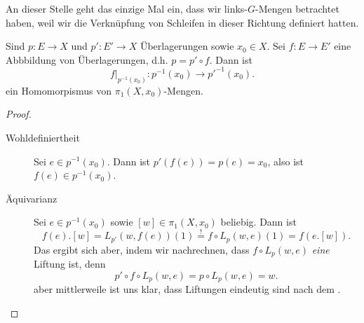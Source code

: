 \begin{oral}
    An dieser Stelle geht das einzige Mal ein, dass wir links-$G$-Mengen betrachtet haben, weil wir die Verknüpfung von Schleifen in dieser Richtung definiert hatten.
\end{oral}

\begin{lemma}
    Sind $p\colon  E\to X$ und $p'\colon E'\to X$ Überlagerungen sowie $x_0\in X$. Sei $f\colon  E\to  E'$ eine Abbbildung von Überlagerungen, d.h. $p = p' \circ f$. Dann ist
    \[
        f|_{p^{-1} (x_0)}\colon  p^{-1} (x_0) \to  p'^{-1}(x_0)
    .\] 
    ein Homomorpismus von $\pi_1(X,x_0)$-Mengen.
\end{lemma}
\begin{proof}
    \begin{description}
        \item[Wohldefiniertheit] Sei $e\in p^{-1} (x_0)$. Dann ist $p'(f(e)) = p(e) = x_0$, also ist $f(e) \in p^{-1} (x_0)$.
        \item[Äquivarianz] Sei $e\in p^{-1} (x_0)$ sowie $[w]\in \pi_1(X,x_0)$ beliebig. Dann ist
            \[
                f(e).[w] = L_{p'}(w,f(e))(1) \stackrel{!}{=} f \circ L_p(w,e)(1) = f(e.[w])
            .\] 
            Das ergibt sich aber, indem wir nachrechnen, dass $f \circ  L_p(w,e)$ \textit{eine} Liftung ist, denn
            \[
                p' \circ  f \circ  L_p(w,e) = p \circ  L_p(w,e) = w
            .\]
            aber mittlerweile ist uns klar, dass Liftungen eindeutig sind nach dem .
    \end{description}
\end{proof}

